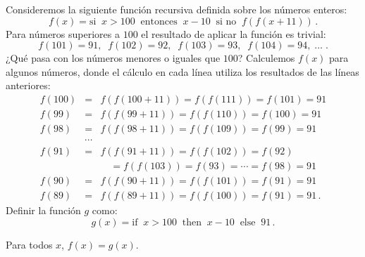 Consideremos la siguiente función recursiva definida sobre los números enteros:
\[
f(x) = \textrm{si}\;\; x > 100 \;\;\textrm{entonces}\;\; x - 10 \;\;\textrm{si no}\;\; f(f(x+11))\,.
\]
Para números superiores a $100$ el resultado de aplicar la función es trivial:
\[
f(101) = 91, \;\; f(102) = 92,\;\; f(103) = 93,\;\; f(104) = 94,\;\ldots\;.
\]
¿Qué pasa con los números menores o iguales que $100$? Calculemos $f(x)$ para algunos números, donde el cálculo en cada línea utiliza los resultados de las líneas anteriores:
\begin{eqnarray*}
f(100) &=& f(f(100+11)) = f(f(111)) = f(101) = 91\\
f(99) &=& f(f(99+11)) = f(f(110)) = f(100) = 91\\
f(98) &=& f(f(98+11)) = f(f(109)) = f(99) = 91\\
&\cdots&\\
f(91) &=& f(f(91+11)) = f(f(102)) = f(92)\\
&& \quad = f(f(103)) = f(93) = \cdots =f(98) = 91\\
f(90) &=& f(f(90+11)) = f(f(101)) = f(91) = 91\\
f(89) &=& f(f(89+11)) = f(f(100)) = f(91) = 91\,.
\end{eqnarray*}
Definir la función $g$ como:
\[
g(x) = \textrm{if}\;\; x > 100 \;\;\textrm{then}\;\; x - 10 \;\;\textrm{else}\;\; 91\,.
\]

\begin{theorem}
Para todos $x$, $f(x) = g(x)$.
\end{theorem}

